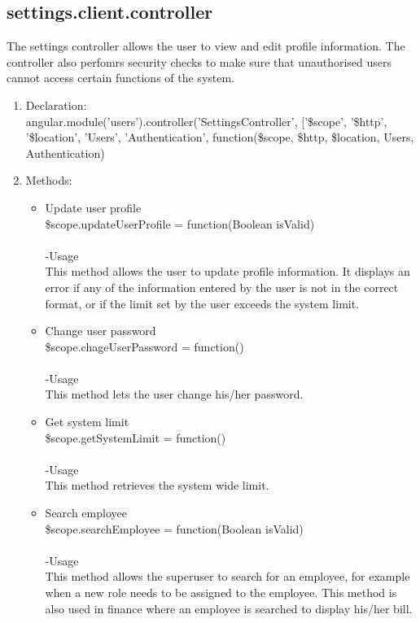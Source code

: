 \documentclass[a4paper,12pt]{report}
\begin{document}
\subsection{settings.client.controller}
 The settings controller allows the user to view and edit profile information. The controller also perfomrs security checks to make sure that unauthorised users cannot access certain functions of the system.
 \begin{enumerate}
 \item Declaration:\\angular.module('users').controller('SettingsController', ['\$scope', '\$http', '\$location', 'Users', 'Authentication',
	function(\$scope, \$http, \$location, Users, Authentication) 
	\item Methods:\\
	\begin{itemize}
	\item Update user profile\\ 
 \$scope.updateUserProfile = function(Boolean isValid) \\ \\
 -Usage\\
 This method allows the user to update profile information. It displays an error if any of the information entered by the user is not in the correct format, or if the limit set by the user exceeds the system limit. 
\item Change user password\\
 \$scope.chageUserPassword = function()\\ \\ 
-Usage\\
This method lets the user change his/her password.

\item Get system limit\\
 \$scope.getSystemLimit = function()\\ \\
-Usage\\
This method retrieves the system wide limit.

\item Search employee\\ 
 \$scope.searchEmployee = function(Boolean isValid)\\  \\
-Usage\\
This method allows the superuser to search for an employee, for example when a new role needs to be assigned to the employee.
This method is also used in finance where an employee is searched to display his/her bill. 


\end{itemize}
\end{enumerate}
\end{document}
